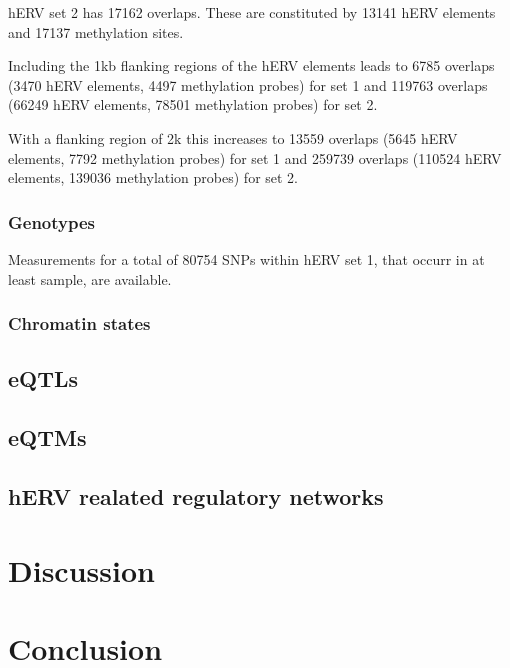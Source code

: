\documentclass[a4paper,12pt]{article}
\begin{document}
hERV set 2 has 17162 overlaps. These are constituted by 13141 hERV elements and 17137 methylation sites.

Including the 1kb flanking regions of the hERV elements leads to 6785 overlaps (3470 hERV elements, 4497 methylation probes) for set 1 and 119763 overlaps (66249 hERV elements, 78501 methylation probes) for set 2.

With a flanking region of 2k this increases to 13559 overlaps (5645 hERV elements, 7792 methylation probes) for set 1 and 259739 overlaps (110524 hERV elements, 139036 methylation probes) for set 2. 

\subsubsection{Genotypes}
Measurements for a total of 80754 SNPs within hERV set 1, that occurr in at least  sample, are available.

\subsubsection{Chromatin states}

\subsection{eQTLs}

\subsection{eQTMs}

\subsection{hERV realated regulatory networks}


\section{Discussion}


\section{Conclusion}
\end{document}
